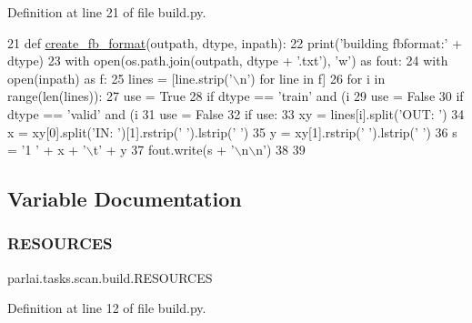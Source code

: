 Definition at line 21 of file build.\+py.


\begin{DoxyCode}
21 \textcolor{keyword}{def }\hyperlink{namespaceparlai_1_1tasks_1_1wikiqa_1_1build_a554828702769592403db58c955d1dfe3}{create\_fb\_format}(outpath, dtype, inpath):
22     print(\textcolor{stringliteral}{'building fbformat:'} + dtype)
23     with open(os.path.join(outpath, dtype + \textcolor{stringliteral}{'.txt'}), \textcolor{stringliteral}{'w'}) \textcolor{keyword}{as} fout:
24         with open(inpath) \textcolor{keyword}{as} f:
25             lines = [line.strip(\textcolor{stringliteral}{'\(\backslash\)n'}) \textcolor{keywordflow}{for} line \textcolor{keywordflow}{in} f]
26             \textcolor{keywordflow}{for} i \textcolor{keywordflow}{in} range(len(lines)):
27                 use = \textcolor{keyword}{True}
28                 \textcolor{keywordflow}{if} dtype == \textcolor{stringliteral}{'train'} \textcolor{keywordflow}{and} (i %
29                     use = \textcolor{keyword}{False}
30                 \textcolor{keywordflow}{if} dtype == \textcolor{stringliteral}{'valid'} \textcolor{keywordflow}{and} (i %
31                     use = \textcolor{keyword}{False}
32                 \textcolor{keywordflow}{if} use:
33                     xy = lines[i].split(\textcolor{stringliteral}{'OUT: '})
34                     x = xy[0].split(\textcolor{stringliteral}{'IN: '})[1].rstrip(\textcolor{stringliteral}{' '}).lstrip(\textcolor{stringliteral}{' '})
35                     y = xy[1].rstrip(\textcolor{stringliteral}{' '}).lstrip(\textcolor{stringliteral}{' '})
36                     s = \textcolor{stringliteral}{'1 '} + x + \textcolor{stringliteral}{'\(\backslash\)t'} + y
37                     fout.write(s + \textcolor{stringliteral}{'\(\backslash\)n\(\backslash\)n'})
38 
39 
\end{DoxyCode}


\subsection{Variable Documentation}
\mbox{\label{namespaceparlai_1_1tasks_1_1scan_1_1build_ac22a9947f9679ca337ee812a9afb6fca}} 
\subsubsection{\texorpdfstring{R\+E\+S\+O\+U\+R\+C\+ES}{RESOURCES}}
{\footnotesize\ttfamily parlai.\+tasks.\+scan.\+build.\+R\+E\+S\+O\+U\+R\+C\+ES}



Definition at line 12 of file build.\+py.

